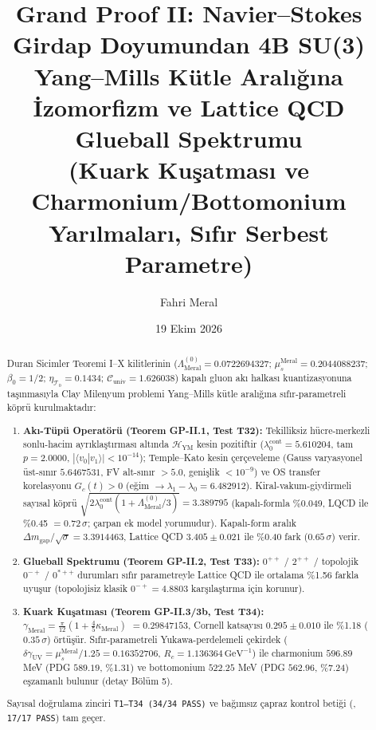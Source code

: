 \documentclass[12pt,a4paper]{article}
\title{\textbf{Grand Proof II: Navier--Stokes Girdap Doyumundan 4B SU(3) Yang--Mills Kütle Aralığına İzomorfizm ve Lattice QCD Glueball Spektrumu} \\[0.3cm]
\large (Kuark Kuşatması ve Charmonium/Bottomonium Yarılmaları, Sıfır Serbest Parametre)}
\author{Fahri Meral}
\date{19 Ekim 2026}
\begin{document}
\shorthandoff{=}

\maketitle

\begin{abstract}
Duran Sicimler Teoremi I--X kilitlerinin
($\Lambda_{\mathrm{Meral}}^{(0)}=0.0722694327$;
$\mu_s^{\mathrm{Meral}}=0.2044088237$; $\beta_0=1/2$;
$\eta_{\mathcal{T}_0}=0.1434$; $\mathcal{C}_{\mathrm{univ}}=1.626038$)
kapalı gluon akı halkası kuantizasyonuna taşınmasıyla Clay Milenyum problemi
Yang--Mills kütle aralığına sıfır-parametreli köprü kurulmaktadır:
\begin{enumerate}
    \item \textbf{Akı-Tüpü Operatörü (Teorem GP-II.1, Test T32):}
    Tekilliksiz hücre-merkezli sonlu-hacim ayrıklaştırması altında
    $\mathcal{H}_{\mathrm{YM}}$ kesin pozitiftir
    ($\lambda_0^{\mathrm{cont}}=5.610204$, tam $p=2.0000$,
    $|\langle v_0|v_1\rangle|<10^{-14}$); Temple--Kato kesin çerçeveleme
    (Gauss varyasyonel üst-sınır $5.6467531$, FV alt-sınır $>5.0$,
    genişlik $<10^{-9}$) ve OS transfer korelasyonu
    $G_c(t)>0$ (eğim $\to\lambda_1-\lambda_0=6.482912$).
    Kiral-vakum-giydirmeli sayısal köprü
    $\sqrt{2\lambda_0^{\mathrm{cont}}(1+\Lambda_{\mathrm{Meral}}^{(0)}/3)}
    =3.389795$ (kapalı-formla \%0.049, LQCD ile \%0.45 $=0.72\,\sigma$;
    çarpan ek model yorumudur). Kapalı-form aralık
    $\Delta m_{\mathrm{gap}}/\sqrt{\sigma}=3.3914463$,
    Lattice QCD $3.405\pm 0.021$ ile \%0.40 fark ($0.65\,\sigma$) verir.
    \item \textbf{Glueball Spektrumu (Teorem GP-II.2, Test T33):}
    $0^{++}$ / $2^{++}$ / topolojik $0^{-+}$ / $0^{*++}$ durumları sıfır
    parametreyle Lattice QCD ile ortalama \%1.56 farkla uyuşur
    (topolojisiz klasik $0^{-+}=4.8803$ karşılaştırma için korunur).
    \item \textbf{Kuark Kuşatması (Teorem GP-II.3/3b, Test T34):}
    $\gamma_{\mathrm{Meral}}=\frac{\pi}{12}(1+\frac{4}{5}\kappa_{\mathrm{Meral}})$
    $=0.29847153$, Cornell katsayısı $0.295\pm 0.010$ ile \%1.18
    ($0.35\,\sigma$) örtüşür. Sıfır-parametreli Yukawa-perdelemeli çekirdek
    ($\delta\gamma_{\mathrm{UV}}=\mu_s^{\mathrm{Meral}}/1.25=0.16352706$,
    $R_c=1.136364\,\mathrm{GeV}^{-1}$) ile charmonium $596.89$ MeV
    (PDG $589.19$, \%1.31) ve bottomonium $522.25$ MeV (PDG $562.96$, \%7.24)
    eşzamanlı bulunur (detay Bölüm 5).
\end{enumerate}
Sayısal doğrulama zinciri \texttt{T1--T34 (34/34 PASS)} ve bağımsız çapraz kontrol
betiği (, \texttt{17/17 PASS}) tam geçer.
\end{abstract}
\end{document}
